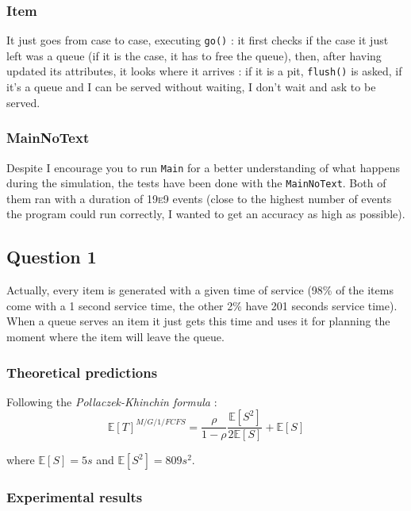 \documentclass[a4paper]{report}
\begin{document}
\subsubsection{Item}
It just goes from case to case, executing \texttt{go()} : it first checks if the case it just left was a queue (if it is the case, it has to free the queue), then, after having updated its attributes, it looks where it arrives : if it is a pit, \texttt{flush()} is asked, if it's a queue and I can be served without waiting, I don't wait and ask to be served.

\subsubsection{MainNoText}
Despite I encourage you to run \texttt{Main} for a better understanding of what happens during the simulation, the tests have been done with the \texttt{MainNoText}. Both of them ran with a duration of 19\textsc{e}9 events (close to the highest number of events the program could run correctly, I wanted to get an accuracy as high as possible).

\newpage
\subsection*{Question 1}
Actually, every item is generated with a given time of service (98\% of the items come with a 1 second service time, the other 2\% have 201 seconds service time). When a queue serves an item it just gets this time and uses it for planning the moment where the item will leave the queue.

\subsubsection*{Theoretical predictions}

Following the \textit{Pollaczek-Khinchin formula} :
\[\mathbb{E}[T]^{M/G/1/FCFS}=\frac{\rho}{1-\rho}\frac{\mathbb{E}[S^{2}]}{2 \mathbb{E}[S]}+\mathbb{E}[S]\]


where $\mathbb{E}[S] = 5s$ and $\mathbb{E}[S^{2}] = 809 s^{2}$.
\subsubsection*{Experimental results}
\end{document}
